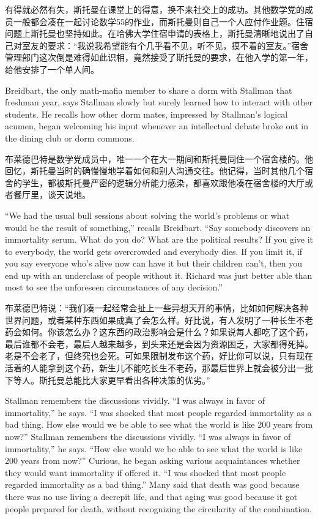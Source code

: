 \ifdefined\chs
有得就必然有失，斯托曼在课堂上的得意，换不来社交上的成功。其他数学党的成员一般都会凑在一起讨论数学55的作业，而斯托曼则自己一个人应付作业题。住宿问题上斯托曼也坚持如此。在哈佛大学住宿申请的表格上，斯托曼清晰地说出了自己对室友的要求：``我说我希望能有个几乎看不见，听不见，摸不着的室友。''宿舍管理部门这次倒是难得如此识相，竟然接受了斯托曼的要求，在他入学的第一年，给他安排了一个单人间。
\fi

\ifdefined\eng
Breidbart, the only math-mafia member to share a dorm with Stallman that freshman year, says Stallman slowly but surely learned how to interact with other students. He recalls how other dorm mates, impressed by Stallman's logical acumen, began welcoming his input whenever an intellectual debate broke out in the dining club or dorm commons.
\fi

\ifdefined\chs
布莱德巴特是数学党成员中，唯一一个在大一期间和斯托曼同住一个宿舍楼的。他回忆，斯托曼当时的确慢慢地学着如何和别人沟通交往。他记得，当时其他几个宿舍的学生，都被斯托曼严密的逻辑分析能力感染，都喜欢跟他凑在宿舍楼的大厅或者餐厅里，谈天说地。
\fi

\ifdefined\eng
``We had the usual bull sessions about solving the world's problems or what would be the result of something,'' recalls Breidbart. ``Say somebody discovers an immortality serum. What do you do? What are the political results? If you give it to everybody, the world gets overcrowded and everybody dies. If you limit it, if you say everyone who's alive now can have it but their children can't, then you end up with an underclass of people without it. Richard was just better able than most to see the unforeseen circumstances of any decision.''
\fi

\ifdefined\chs
布莱德巴特说：``我们凑一起经常会扯上一些异想天开的事情，比如如何解决各种世界问题，或者某种东西如果成真了会怎么样。好比说，有人发明了一种长生不老药会如何。你该怎么办？这东西的政治影响会是什么？如果说每人都吃了这个药，最后谁都不会老，最后人越来越多，到头来还是会因为资源困乏，大家都得死掉。老是不会老了，但终究也会死。可如果限制发布这个药，好比你可以说，只有现在活着的人能拿到这个药，新生儿不能吃长生不老药，那最后世界上就会被分出一批下等人。斯托曼总能比大家更早看出各种决策的优劣。''
\fi

\ifdefined\eng
\ifdefined\vone
Stallman remembers the discussions vividly. ``I was always in favor of immortality,'' he says. ``I was shocked that most people regarded immortality as a bad thing. How else would we be able to see what the world is like 200 years from now?''
\fi
\ifdefined\vtwo
Stallman remembers the discussions vividly. ``I was always in favor of immortality,'' he says. ``How else would we be able to see what the world is like 200 years from now?'' Curious, he began asking various acquaintances whether they would want immortality if offered it. ``I was shocked that most people regarded immortality as a bad thing.'' Many said that death was good because there was no use living a decrepit life, and that aging was good because it got people prepared for death, without recognizing the circularity of the combination.
\fi
\fi

